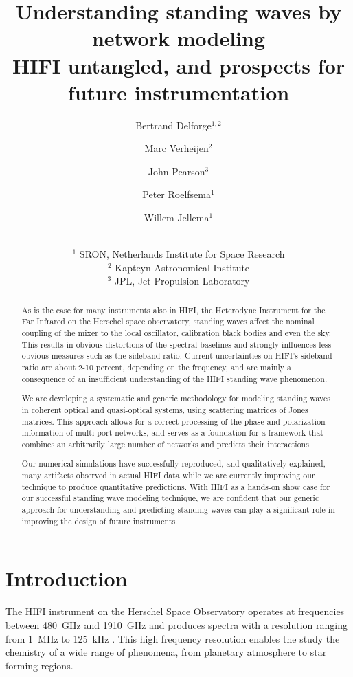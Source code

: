 \documentclass[a4paper,11pt]{article}
\title{Understanding standing waves by network modeling
\\
HIFI untangled, and prospects for future instrumentation}
\author{Bertrand Delforge$^{1, 2}$
       \and
       Marc Verheijen$^2$
       \and
       John Pearson$^3$
       \and
       Peter Roelfsema$^1$
       \and
       Willem Jellema$^1$
       \and
       \\ \footnotesize $^1$ SRON, Netherlands Institute for Space Research
       \\ \footnotesize $^2$ Kapteyn Astronomical Institute
       \\ \footnotesize $^3$ JPL, Jet Propulsion Laboratory
}
\begin{document}
\maketitle

\begin{abstract}
As is the case for many instruments also in HIFI, the Heterodyne Instrument for the Far Infrared on the Herschel space observatory, standing waves affect the nominal coupling of the mixer to the local oscillator, calibration black bodies and even the sky.  This results in obvious distortions of the spectral baselines and strongly influences less obvious measures such as the sideband ratio.  Current uncertainties on HIFI's sideband ratio are about 2-10 percent, depending on the frequency, and are mainly a consequence of an insufficient understanding of the HIFI standing wave phenomenon.

We are developing a systematic and generic methodology for modeling standing waves in coherent optical and quasi-optical systems, using scattering matrices of Jones matrices.  This approach allows for a correct processing of the phase and polarization information of multi-port networks, and serves as a foundation for a framework that combines an arbitrarily large number of networks and predicts their interactions.

Our numerical simulations have successfully reproduced, and qualitatively explained, many artifacts observed in actual HIFI data while we are currently improving our technique to produce quantitative predictions.  With HIFI as a hands-on show case for our successful standing wave modeling technique, we are confident that our generic approach for understanding and predicting standing waves can play a significant role in improving the design of future instruments.
\end{abstract}






\section{Introduction}
The HIFI instrument on the Herschel Space Observatory \cite{AA_518_L1} operates at frequencies between \SI{480}{\giga\hertz} and \SI{1910}{\giga\hertz}
and produces spectra with a resolution ranging from \SI{1}{\mega\hertz} to \SI{125}{\kilo\hertz} \cite{AA_518_L6}.
This high frequency resolution enables the study the chemistry of a wide range of phenomena, from planetary atmosphere to star forming regions.
\end{document}
